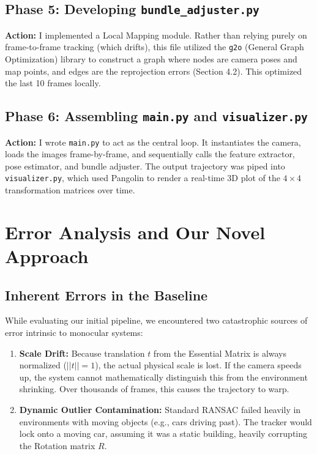 \documentclass[12pt]{article}
\begin{document}
\subsection{Phase 5: Developing \texttt{bundle\_adjuster.py}}
\textbf{Action:} I implemented a Local Mapping module. Rather than relying purely on frame-to-frame tracking (which drifts), this file utilized the \texttt{g2o} (General Graph Optimization) library to construct a graph where nodes are camera poses and map points, and edges are the reprojection errors (Section 4.2). This optimized the last 10 frames locally.

\subsection{Phase 6: Assembling \texttt{main.py} and \texttt{visualizer.py}}
\textbf{Action:} I wrote \texttt{main.py} to act as the central loop. It instantiates the camera, loads the images frame-by-frame, and sequentially calls the feature extractor, pose estimator, and bundle adjuster. The output trajectory was piped into \texttt{visualizer.py}, which used Pangolin to render a real-time 3D plot of the $4 \times 4$ transformation matrices over time.

\section{Error Analysis and Our Novel Approach}

\subsection{Inherent Errors in the Baseline}
While evaluating our initial pipeline, we encountered two catastrophic sources of error intrinsic to monocular systems:
\begin{enumerate}
    \item \textbf{Scale Drift:} Because translation $t$ from the Essential Matrix is always normalized ($||t|| = 1$), the actual physical scale is lost. If the camera speeds up, the system cannot mathematically distinguish this from the environment shrinking. Over thousands of frames, this causes the trajectory to warp.
    \item \textbf{Dynamic Outlier Contamination:} Standard RANSAC failed heavily in environments with moving objects (e.g., cars driving past). The tracker would lock onto a moving car, assuming it was a static building, heavily corrupting the Rotation matrix $R$.
\end{enumerate}
\end{document}
